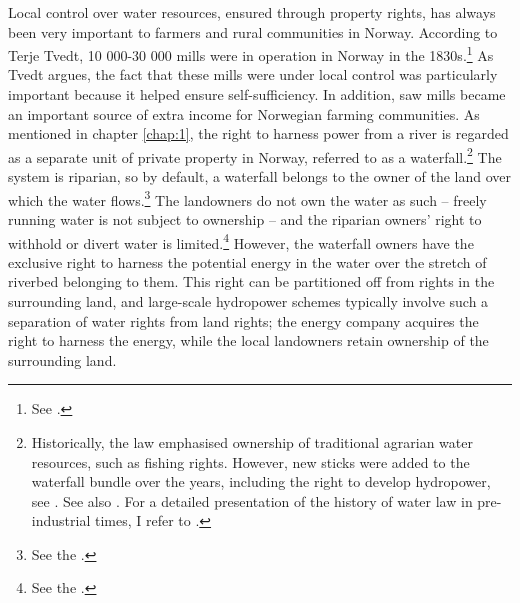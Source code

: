 Local control over water resources, ensured through property rights, has always been very important to farmers and rural communities in Norway. According to Terje Tvedt, 10 000-30 000 mills were in operation in Norway in the 1830s.\footnote{See \cite[121]{tvedt13}.} As Tvedt argues, the fact that these mills were under local control was particularly important because it helped ensure self-sufficiency. In addition, saw mills became an important source of extra income for Norwegian farming communities. As mentioned in chapter \ref{chap:1}, the right to harness power from a river is regarded as a separate unit of private property in Norway, referred to as a waterfall.\footnote{Historically, the law emphasised ownership of traditional agrarian water resources, such as fishing rights. However, new sticks were added to the waterfall bundle over the years, including the right to develop hydropower, see \cite[14-32]{vislie44}. See also \cite[108]{nordtveit15}. For a detailed presentation of the history of water law in pre-industrial times, I refer to \cite{motzfeld08}.} The system is riparian, so by default, a waterfall belongs to the owner of the land over which the water flows.\footnote{See the \dni\cite[13]{wra00}.} The landowners do not own the water as such -- freely running water is not subject to ownership -- and the riparian owners' right to withhold or divert water is limited.\footnote{See the \dni\cite[8|15]{wra00}.} However, the waterfall owners have the exclusive right to harness the potential energy in the water over the stretch of riverbed belonging to them. This right can be partitioned off from rights in the surrounding land, and large-scale hydropower schemes typically involve such a separation of water rights from land rights; the energy company acquires the right to harness the energy, while the local landowners retain ownership of the surrounding land.


